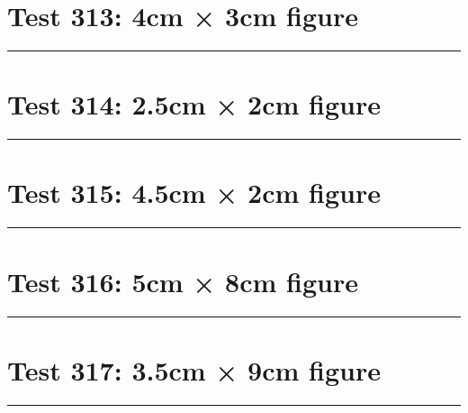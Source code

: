 \documentclass[a4paper,11pt]{article}
\begin{document}
\section*{Test 313: 4cm × 3cm figure}
\begin{swarmwrap}%
  \begin{minipage}[t]{4cm}
    \centering
    \rule{\linewidth}{3cm}
  \end{minipage}%
\end{swarmwrap}%
\swarmwrapnext
\lipsum[130]
\lipsum[131]
\lipsum[132]
\lipsum[133]
\lipsum[134]
\lipsum[135]
\section*{Test 314: 2.5cm × 2cm figure}
\begin{swarmwrap}%
  \begin{minipage}[t]{2cm}
    \centering
    \rule{\linewidth}{2cm}
  \end{minipage}%
\end{swarmwrap}%
\swarmwrapnext
\lipsum[119]
\lipsum[120]
\lipsum[121]
\lipsum[122]
\lipsum[123]
\section*{Test 315: 4.5cm × 2cm figure}
\begin{swarmwrap}%
  \begin{minipage}[t]{4cm}
    \centering
    \rule{\linewidth}{2cm}
  \end{minipage}%
\end{swarmwrap}%
\swarmwrapnext
\lipsum[124]
\lipsum[125]
\lipsum[126]
\section*{Test 316: 5cm × 8cm figure}
\begin{swarmwrap}%
  \begin{minipage}[t]{5cm}
    \centering
    \rule{\linewidth}{8cm}
  \end{minipage}%
\end{swarmwrap}%
\swarmwrapnext
\lipsum[29]
\lipsum[30]
\lipsum[31]
\lipsum[32]
\lipsum[33]
\lipsum[34]
\section*{Test 317: 3.5cm × 9cm figure}
\begin{swarmwrap}%
  \begin{minipage}[t]{3cm}
    \centering
    \rule{\linewidth}{9cm}
  \end{minipage}%
\end{swarmwrap}%
\swarmwrapnext
\lipsum[22]
\lipsum[23]
\lipsum[24]
\end{document}
